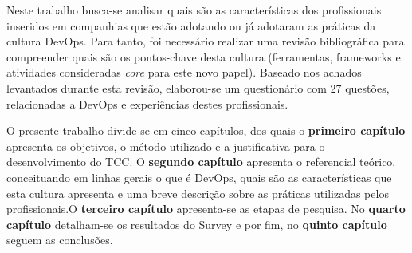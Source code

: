\documentclass[twoside,english,brazilian]{UNISINOSartigo}
\begin{document}


Neste trabalho busca-se analisar quais são as características dos profissionais inseridos em companhias que estão adotando ou já adotaram as práticas da cultura DevOps. Para tanto, foi necessário realizar uma revisão bibliográfica para compreender quais são os pontos-chave desta cultura (ferramentas, frameworks e atividades consideradas \textit{core} para este novo papel). Baseado nos achados levantados durante esta revisão, elaborou-se um questionário com 27 questões, relacionadas a DevOps e experiências destes profissionais. 

O presente trabalho divide-se em cinco capítulos, dos quais o \textbf{primeiro capítulo} apresenta os objetivos, o método utilizado e a justificativa para o desenvolvimento do TCC. O \textbf{segundo capítulo} apresenta o referencial teórico, conceituando em linhas gerais o que é DevOps, quais são as características que esta cultura apresenta e uma breve descrição sobre as práticas utilizadas pelos profissionais.O \textbf{terceiro capítulo} apresenta-se as etapas de pesquisa. No \textbf{quarto capítulo} detalham-se os resultados do Survey e por fim, no \textbf{quinto capítulo} seguem as conclusões.
\end{document}
